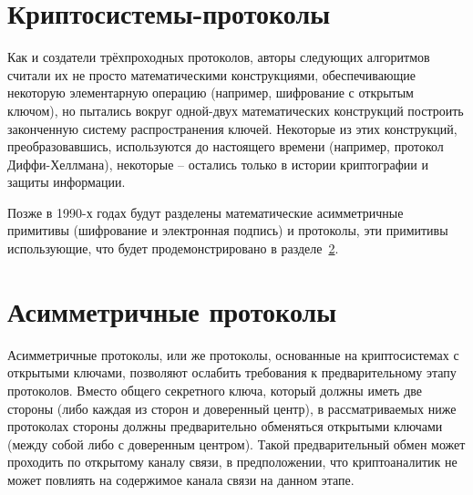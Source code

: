 \section{Криптосистемы-протоколы}
Как и создатели трёхпроходных протоколов, авторы следующих алгоритмов считали их не просто математическими конструкциями, обеспечивающие некоторую элементарную операцию (например, шифрование с открытым ключом), но пытались вокруг одной-двух математических конструкций построить законченную систему распространения ключей. Некоторые из этих конструкций, преобразовавшись, используются до настоящего времени (например, протокол Диффи-Хеллмана), некоторые -- остались только в истории криптографии и защиты информации.

Позже в 1990-х годах будут разделены математические асимметричные примитивы (шифрование и электронная подпись) и протоколы, эти примитивы использующие, что будет продемонстрировано в разделе~\ref{section-protocols-asymmetric}.









\section{Асимметричные протоколы}\label{section-protocols-asymmetric}

Асимметричные протоколы, или же протоколы, основанные на криптосистемах с открытыми ключами, позволяют ослабить требования к предварительному этапу протоколов. Вместо общего секретного ключа, который должны иметь две стороны (либо каждая из сторон и доверенный центр), в рассматриваемых ниже протоколах стороны должны предварительно обменяться открытыми ключами (между собой либо с доверенным центром). Такой предварительный обмен может проходить по открытому каналу связи, в предположении, что криптоаналитик не может повлиять на содержимое канала связи на данном этапе.







